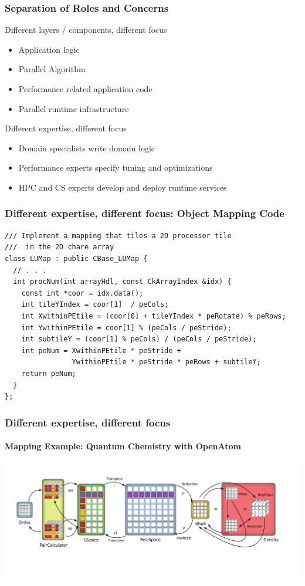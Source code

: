 \begin{frame}
\frametitle{Separation of Roles and Concerns}
\begin{block}{Different layers / components, different focus}
    \begin{itemize}
        \item Application logic
        \item Parallel Algorithm
        \item Performance related application code
        \item Parallel runtime infrastructure
    \end{itemize}
\end{block}
\pause
\begin{block}{Different expertise, different focus}
    \begin{itemize}
        \item Domain specialists write domain logic
        \item Performance experts specify tuning and optimizations
        \item HPC and CS experts develop and deploy runtime services
    \end{itemize}
\end{block}
\end{frame}


\begin{frame}[fragile]
\frametitle{Different expertise, different focus: Object Mapping Code}
\begin{lstlisting}
/// Implement a mapping that tiles a 2D processor tile
///  in the 2D chare array
class LUMap : public CBase_LUMap {
  // . . . 
  int procNum(int arrayHdl, const CkArrayIndex &idx) {
    const int *coor = idx.data();
    int tileYIndex = coor[1]  / peCols;
    int XwithinPEtile = (coor[0] + tileYIndex * peRotate) % peRows;
    int YwithinPEtile = coor[1] % (peCols / peStride);
    int subtileY = (coor[1] % peCols) / (peCols / peStride);
    int peNum = XwithinPEtile * peStride +
                YwithinPEtile * peStride * peRows + subtileY;
    return peNum;
  }
};
\end{lstlisting}
\end{frame}

\begin{frame}
\frametitle{Different expertise, different focus}
\framesubtitle{Mapping Example: Quantum Chemistry with {\sc OpenAtom}}
\includegraphics[width=\textwidth]{../figures/openatom/control-flow.pdf}
\end{frame}

